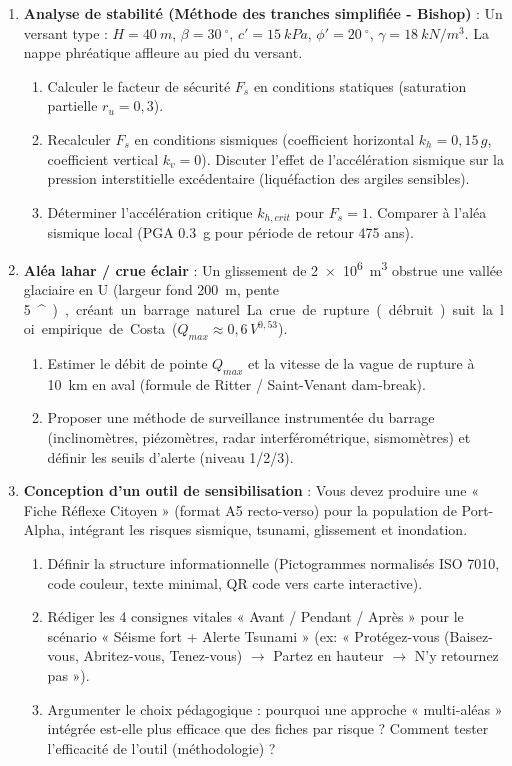\documentclass[11pt]{article}
\providecommand{\degree}{^{\circ}}
\begin{document}
\begin{exercice}
\begin{enumerate}
\item \textbf{Analyse de stabilité (Méthode des tranches simplifiée - Bishop)} :
      Un versant type : $H = \SI{40}{m}$, $\beta = \SI{30}{\degree}$, $c' = \SI{15}{kPa}$, $\phi' = \SI{20}{\degree}$, $\gamma = \SI{18}{kN/m^3}$. La nappe phréatique affleure au pied du versant.
      \begin{enumerate}
      \item Calculer le facteur de sécurité $F_s$ en conditions statiques (saturation partielle $r_u = 0,3$).
      \item Recalculer $F_s$ en conditions sismiques (coefficient horizontal $k_h = 0,15\,g$, coefficient vertical $k_v = 0$). Discuter l'effet de l'accélération sismique sur la pression interstitielle excédentaire (liquéfaction des argiles sensibles).
      \item Déterminer l'accélération critique $k_{h,crit}$ pour $F_s = 1$. Comparer à l'aléa sismique local (PGA \SI{0,3}{g} pour période de retour 475 ans).
      \end{enumerate}
\item \textbf{Aléa lahar / crue éclair} : Un glissement de \SI{2e6}{m^3} obstrue une vallée glaciaire en U (largeur fond \SI{200}{m}, pente \SI{5}{\degree}), créant un barrage naturel. La crue de rupture (débruit) suit la loi empirique de Costa ($Q_{max} \approx 0,6\, V^{0,53}$).
      \begin{enumerate}
      \item Estimer le débit de pointe $Q_{max}$ et la vitesse de la vague de rupture à \SI{10}{km} en aval (formule de Ritter / Saint-Venant dam-break).
      \item Proposer une méthode de surveillance instrumentée du barrage (inclinomètres, piézomètres, radar interférométrique, sismomètres) et définir les seuils d'alerte (niveau 1/2/3).
      \end{enumerate}
\item \textbf{Conception d'un outil de sensibilisation} : Vous devez produire une « Fiche Réflexe Citoyen » (format A5 recto-verso) pour la population de Port-Alpha, intégrant les risques sismique, tsunami, glissement et inondation.
      \begin{enumerate}
      \item Définir la structure informationnelle (Pictogrammes normalisés ISO 7010, code couleur, texte minimal, QR code vers carte interactive).
      \item Rédiger les 4 consignes vitales « Avant / Pendant / Après » pour le scénario « Séisme fort + Alerte Tsunami » (ex: « Protégez-vous (Baisez-vous, Abritez-vous, Tenez-vous) $\to$ Partez en hauteur $\to$ N'y retournez pas »).
      \item Argumenter le choix pédagogique : pourquoi une approche « multi-aléas » intégrée est-elle plus efficace que des fiches par risque ? Comment tester l'efficacité de l'outil (méthodologie) ?
      \end{enumerate}
\end{enumerate}
\end{exercice}
\end{document}
